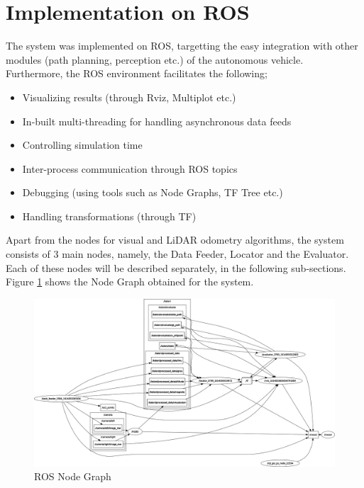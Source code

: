 \section{Implementation on \acrlong{ROS}}
The system was implemented on \gls{ROS}, targetting the easy integration with other modules (path planning, perception etc.) of the autonomous vehicle. Furthermore, the \gls{ROS} environment facilitates the following;
\begin{itemize}
	\item Visualizing results (through Rviz, Multiplot etc.)
	\item In-built multi-threading for handling asynchronous data feeds
	\item Controlling simulation time
	\item Inter-process communication through \gls{ROS} topics
	\item Debugging (using tools such as Node Graphs, TF Tree etc.)
	\item Handling transformations (through TF)
\end{itemize}
Apart from the nodes for visual and \gls{LiDAR} odometry algorithms, the system consists of 3 main nodes, namely, the Data Feeder, Locator and the Evaluator. Each of these nodes will be described separately, in the following sub-sections. Figure \ref{fig:pa:nodeGraph} shows the Node Graph obtained for the system.

\begin{figure}[h]
	\begin{center}
	\includegraphics[width=\textwidth]{figs/rosgraph.png}
	\end{center}
	\vspace{-0.5cm}
	\caption[\gls{ROS} Node Graph]{\gls{ROS} Node Graph}
	\label{fig:pa:nodeGraph}
	\vspace{0.5cm}
\end{figure}

